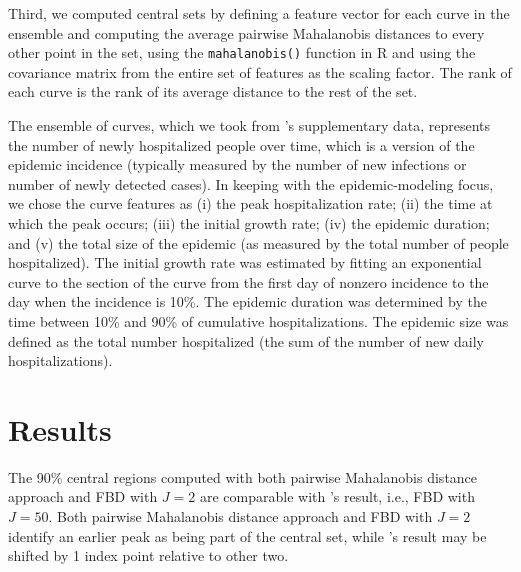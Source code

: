 \documentclass[fleqn,10pt,lineno]{wlpeerj}
\begin{document}
Third, we computed central sets by defining a feature vector for each curve in the ensemble and computing the average pairwise Mahalanobis distances to every other point in the set, using the {\tt mahalanobis()} function in R and using the covariance matrix from the entire  set of features as the scaling factor. The rank of each curve is the rank of its average distance to the rest of the set.

The ensemble of curves, which we took from \cite{juul2021fixed}'s supplementary data, represents the number of newly hospitalized people over time, which is a version of the epidemic incidence (typically measured by the number of new infections or number of newly detected cases).
In keeping with the epidemic-modeling focus, we chose the curve features as (i) the peak
hospitalization rate; (ii) the time at which the peak occurs; (iii) the initial growth rate; (iv) the epidemic duration; and (v) the total size of the epidemic (as measured by the total number of people hospitalized). The initial growth rate was estimated by fitting an exponential curve to the section of the curve from the first day of nonzero incidence to the day when the incidence is 10\%. The epidemic duration was determined by the time between 10\% and 90\% of cumulative hospitalizations. The epidemic size was defined as the total number hospitalized (the sum of the number of new daily hospitalizations).

\section*{Results}

The 90\% central regions computed with both pairwise Mahalanobis distance approach and FBD with $J=2$ are comparable with \juul's result, i.e., FBD with $J=50$. Both pairwise Mahalanobis distance approach and FBD with $J=2$ identify an earlier peak as being part of the central set, while \juul's result may be shifted by 1 index point relative to other two.
\end{document}
